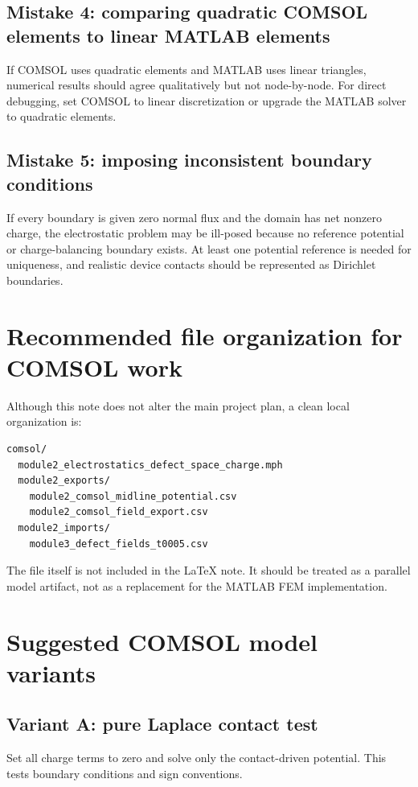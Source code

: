 \documentclass[11pt]{article}
\newcommand{\code}[1]{\texttt{\detokenize{#1}}}
\begin{document}
\subsection{Mistake 4: comparing quadratic COMSOL elements to linear MATLAB elements}

If COMSOL uses quadratic elements and MATLAB uses linear triangles, numerical results should agree qualitatively but not node-by-node. For direct debugging, set COMSOL to linear discretization or upgrade the MATLAB solver to quadratic elements.

\subsection{Mistake 5: imposing inconsistent boundary conditions}

If every boundary is given zero normal flux and the domain has net nonzero charge, the electrostatic problem may be ill-posed because no reference potential or charge-balancing boundary exists. At least one potential reference is needed for uniqueness, and realistic device contacts should be represented as Dirichlet boundaries.

\section{Recommended file organization for COMSOL work}

Although this note does not alter the main project plan, a clean local organization is:
\begin{verbatim}
comsol/
  module2_electrostatics_defect_space_charge.mph
  module2_exports/
    module2_comsol_midline_potential.csv
    module2_comsol_field_export.csv
  module2_imports/
    module3_defect_fields_t0005.csv
\end{verbatim}
The \code{.mph} file itself is not included in the LaTeX note. It should be treated as a parallel model artifact, not as a replacement for the MATLAB FEM implementation.

\section{Suggested COMSOL model variants}

\subsection{Variant A: pure Laplace contact test}

Set all charge terms to zero and solve only the contact-driven potential. This tests boundary conditions and sign conventions.
\end{document}
